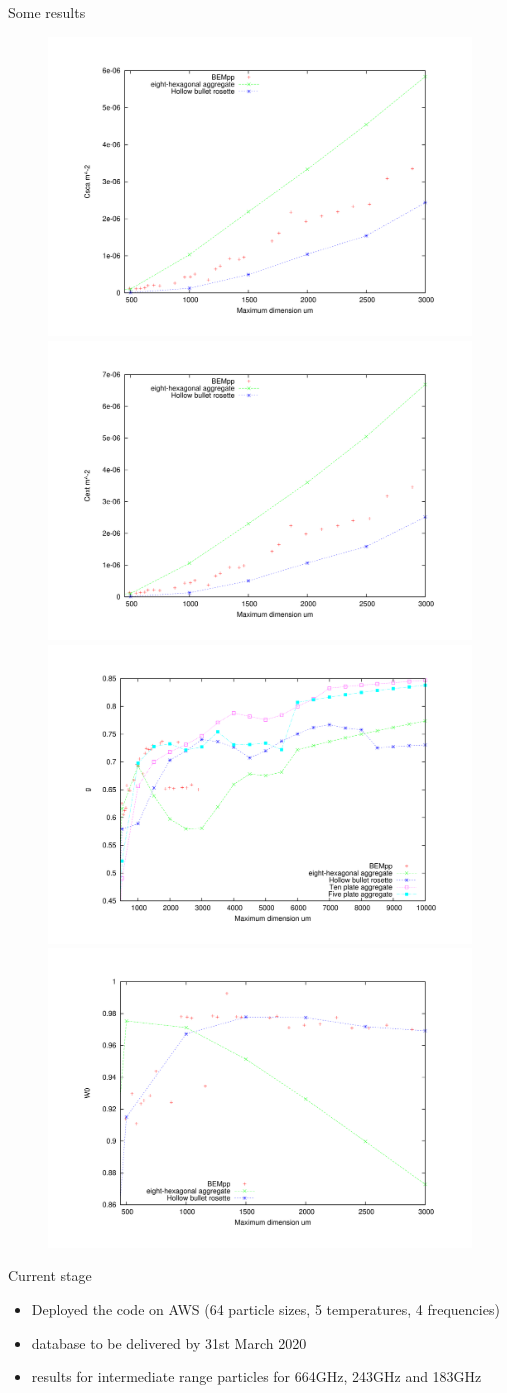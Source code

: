 \documentclass[12pt]{beamer}
\begin{document}
\begin{frame}{Some results}
    \begin{figure}
        \centering
        \includegraphics[width = 0.49 \textwidth]{Figures/rosette_aggregate_664ghz_tc_190_yang_csca.png}
        \includegraphics[width = 0.49 \textwidth]{Figures/rosette_aggregate_664ghz_tc_190_yang.png}
        \\
        \includegraphics[width = 0.49 \textwidth]{Figures/rosette_aggregate_664ghz_tc_190_yang_g.png}
        \includegraphics[width = 0.49 \textwidth]{Figures/rosette_aggregate_664ghz_tc_190_yang_w0.png}
    \end{figure}
\end{frame}

\begin{frame}{Current stage}
    \begin{itemize}
        \item Deployed the code on AWS (64 particle sizes, 5 temperatures, 4 frequencies)
        \item database to be delivered by 31st March 2020
        \item results for intermediate range particles for 664GHz, 243GHz and 183GHz
    \end{itemize}
\end{frame}
\end{document}
